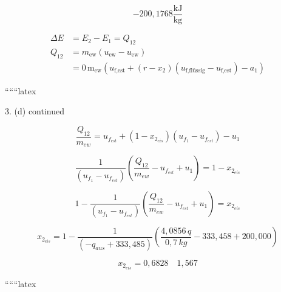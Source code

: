 \[
\boxed{-200,1768 \frac{\text{kJ}}{\text{kg}}}
\]

\begin{align*}
\Delta E &= E_2 - E_1 = Q_{12} \\
Q_{12} &= m_{\text{ew}} (u_{\text{ew}} - u_{\text{ew}}) \\
&= 0 \, \text{m}_{\text{ew}} \left( u_{\text{f,est}} + (r-x_2) (u_{\text{f,flüssig}} - u_{\text{f,est}}) - a_1 \right)
\end{align*}

``````latex


3. (d) continued

\begin{equation*}
\frac{Q_{12}}{m_{ew}} = u_{f_{est}} + (1 - x_{2_{eis}})(u_{f_1} - u_{f_{est}}) - u_1
\end{equation*}

\begin{equation*}
\frac{1}{(u_{f_1} - u_{f_{est}})} \left( \frac{Q_{12}}{m_{ew}} - u_{f_{est}} + u_1 \right) = 1 - x_{2_{eis}}
\end{equation*}

\begin{equation*}
1 - \frac{1}{(u_{f_1} - u_{f_{est}})} \left( \frac{Q_{12}}{m_{ew}} - u_{f_{est}} + u_1 \right) = x_{2_{eis}}
\end{equation*}

\begin{equation*}
x_{2_{eis}} = 1 - \frac{1}{(-q_{aus} + 333,485)} \left( \frac{4,0856 \, q}{0,7 \, kg} - 333,458 + 200,000 \right)
\end{equation*}

\begin{equation*}
x_{2_{eis}} = \boxed{0,6828} \quad \boxed{1,567}
\end{equation*}

``````latex


